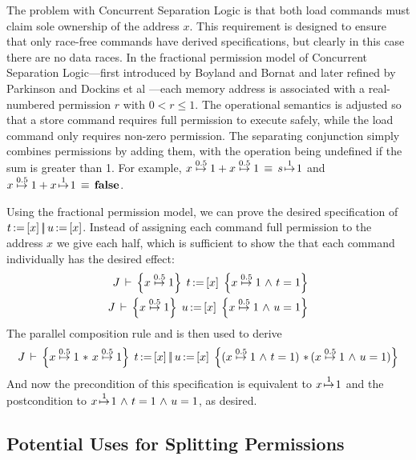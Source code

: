 \documentclass[11pt]{report}
\begin{document}
The problem with Concurrent Separation Logic is that both load commands must claim sole ownership of the address $x$. This requirement is designed to ensure that only race-free commands have derived specifications, but clearly in this case there are no data races. In the fractional permission model of Concurrent Separation Logic---first introduced by Boyland and Bornat \cite{DBLP:conf/sas/Boyland03,DBLP:conf/popl/BornatCOP05} and later refined by Parkinson and Dockins et al \cite{ParkinsonDissertation,DBLP:conf/aplas/DockinsHA09}---each memory address is associated with a real-numbered permission $r$ with $0 < r \leq 1$. The operational semantics is adjusted so that a store command requires full permission to execute safely, while the load command only requires non-zero permission. The separating conjunction simply combines permissions by adding them, with the operation being undefined if the sum is greater than 1. For example, $x \stackrel{0.5}{\!\mapsto\!} 1 + x \stackrel{0.5}{\!\mapsto\!} 1 \,\equiv\, s \stackrel{1}{\!\mapsto\!} 1$ and $x \stackrel{0.5}{\!\mapsto\!} 1 + x \stackrel{1}{\!\mapsto\!} 1 \,\equiv\, \mathbf{false}$.

Using the fractional permission model, we can prove the desired specification of $t \operatorname{:\!=} \left[ x \right] \operatorname{|\!|} u \operatorname{:\!=} \left[ x \right]$. Instead of assigning each command full permission to the address $x$ we give each half, which is sufficient to show the that each command individually has the desired effect: \begin{align*}
  \spec{J}{x \stackrel{0.5}{\fpointsto} 1}{\cload{t}{x}}{x \stackrel{0.5}{\fpointsto} 1 \conj t = 1} \\
  \spec{J}{x \stackrel{0.5}{\fpointsto} 1}{\cload{u}{x}}{x \stackrel{0.5}{\fpointsto} 1 \conj u = 1}  
\end{align*} The parallel composition rule and is then used to derive \[ \spec{J}{x \stackrel{0.5}{\fpointsto} 1 \fsep x \stackrel{0.5}{\fpointsto} 1}{\cload{t}{x}\oppar \cload{u}{x}}{(x \stackrel{0.5}{\fpointsto} 1 \conj t = 1) \fsep (x \stackrel{0.5}{\fpointsto} 1 \conj u = 1)}\] And now the precondition of this specification is equivalent to $x \stackrel{1}{\!\mapsto\!} 1$ and the postcondition to $x \stackrel{1}{\!\mapsto\!} 1 \operatorname{\,\wedge\,} t = 1 \operatorname{\,\wedge\,} u = 1$, as desired. 

\subsection{Potential Uses for Splitting Permissions}
\end{document}

